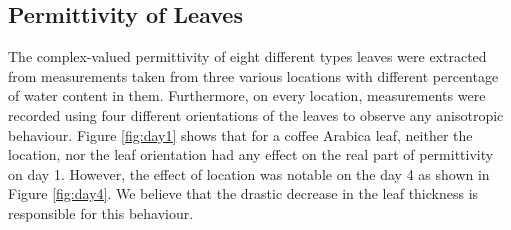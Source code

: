 \documentclass[preprints,article,accept,moreauthors,pdftex]{Definitions/mdpi}
\renewcommand{\^}{\hat}  %
\begin{document}
\subsection{Permittivity of Leaves}
%
{The complex-valued permittivity of eight different types leaves were extracted from measurements taken from three various locations with different percentage of water content in them. Furthermore, on every location, measurements were recorded using four different orientations of the leaves to observe any anisotropic behaviour. Figure }\ref{fig:day1}{ shows that for a coffee Arabica leaf, neither the location, nor the leaf orientation had any effect on the real part of permittivity on day 1. However, the effect of location was notable on the day 4 as shown in Figure }\ref{fig:day4}{. We believe that the drastic decrease in the leaf thickness is responsible for this behaviour.}


\end{document}
